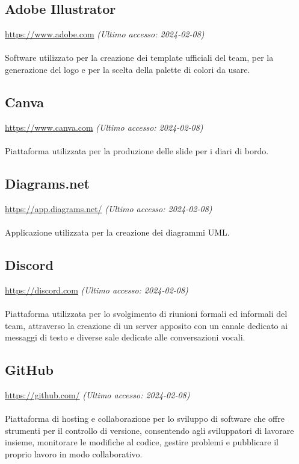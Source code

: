 \documentclass[10pt, a4paper]{article}
\begin{document}
\subsection{Adobe Illustrator}
\href{https://www.adobe.com}{https://www.adobe.com} \textit{(Ultimo accesso: 2024-02-08)}\\\\
Software utilizzato per la creazione dei template ufficiali del team, per la generazione del logo e per la scelta della palette di colori da usare. 

\subsection{Canva}
\href{https://www.canva.com}{https://www.canva.com} \textit{(Ultimo accesso: 2024-02-08)}\\\\
Piattaforma utilizzata per la produzione delle slide per i diari di bordo. 

\subsection{Diagrams.net}
\href{https://app.diagrams.net/}{https://app.diagrams.net/} \textit{(Ultimo accesso: 2024-02-08)}\\\\
Applicazione utilizzata per la creazione dei diagrammi UML.

\subsection{Discord}
\href{https://discord.com}{https://discord.com} \textit{(Ultimo accesso: 2024-02-08)}\\\\
Piattaforma utilizzata per lo svolgimento di riunioni formali ed informali del team, attraverso la creazione di un server apposito con un canale dedicato ai messaggi di testo e diverse sale dedicate alle conversazioni vocali.

\subsection{GitHub}
\href{https://github.com/}{https://github.com/} \textit{(Ultimo accesso: 2024-02-08)}\\\\
Piattaforma di hosting e collaborazione per lo sviluppo di software che offre strumenti per il controllo di versione, consentendo agli sviluppatori di lavorare insieme, monitorare le modifiche al codice, gestire problemi e pubblicare il proprio lavoro in modo collaborativo.
\end{document}
